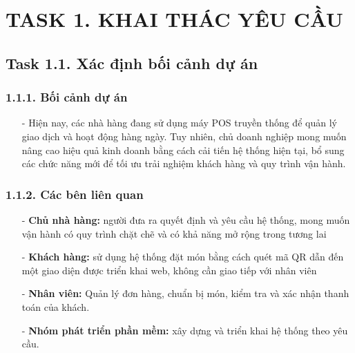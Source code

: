 \documentclass[a4paper]{article}
\begin{document}
\newpage
\tableofcontents
\newpage

\section{TASK 1. KHAI THÁC YÊU CẦU}

\subsection{Task 1.1. Xác định bối cảnh dự án}

\subsubsection{1.1.1. Bối cảnh dự án}
\begin{itemize}
    \item[-]Hiện nay, các nhà hàng đang sử dụng máy POS truyền thống để quản lý giao dịch và hoạt động hàng ngày. Tuy nhiên, chủ doanh nghiệp mong muốn nâng cao hiệu quả kinh doanh bằng cách cải tiến hệ thống hiện tại, bổ sung các chức năng mới để tối ưu trải nghiệm khách hàng và quy trình vận hành.
\end{itemize}

\subsubsection{1.1.2. Các bên liên quan}
\begin{itemize}
    \item[-] \textbf{Chủ nhà hàng:} người đưa ra quyết định và yêu cầu hệ thống, mong muốn vận hành có quy trình chặt chẽ và có khả năng mở rộng trong tương lai
    \item[-] \textbf{Khách hàng:} sử dụng hệ thống đặt món bằng cách quét mã QR dẫn đến một giao diện được triển khai web, không cần giao tiếp với nhân viên
    \item[-] \textbf{Nhân viên:} Quản lý đơn hàng, chuẩn bị món, kiểm tra và xác nhận thanh toán của khách.
    \item[-] \textbf{Nhóm phát triển phần mềm:} xây dựng và triển khai hệ thống theo yêu cầu.
\end{itemize}
\end{document}
